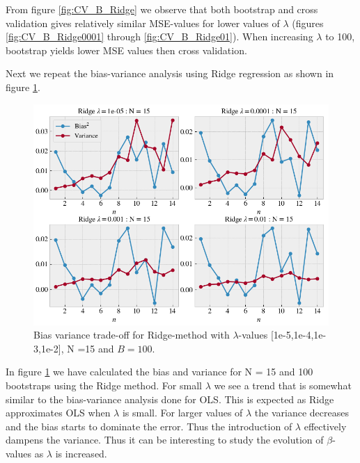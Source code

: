 \documentclass[norsk,a4paper,12pt]{scrartcl}
\begin{document}
From figure \ref{fig:CV_B_Ridge} we observe that both bootstrap and cross validation gives relatively similar MSE-values for lower values of $\lambda$ (figures \ref{fig:CV_B_Ridge0001} through \ref{fig:CV_B_Ridge01}). When increasing $\lambda$ to 100, bootstrap yields lower MSE values then cross validation.\par 
Next we repeat the bias-variance analysis using Ridge regression as shown in figure \ref{fig:b_v_ridge}.

\begin{figure}[H]
     \centering
     \includegraphics[width=\textwidth]{figures/BVT_Ridge.png}
     \caption{Bias variance trade-off for Ridge-method with $\lambda$-values [1e-5,1e-4,1e-3,1e-2], N =15 and $B = 100$.}
     \label{fig:b_v_ridge}
\end{figure}
In figure \ref{fig:b_v_ridge} we have calculated the bias and  variance for N = 15 and 100 bootstraps using the Ridge method. For small $\lambda$ we see a trend that is somewhat similar to the bias-variance analysis done for OLS. This is expected as Ridge approximates OLS when $\lambda$ is small. For larger values of $\lambda$ the variance decreases and the bias starts to dominate the error. Thus the introduction of $\lambda$ effectively dampens the variance. Thus it can be interesting to study the evolution of $\beta$-values as $\lambda$ is increased.
\newline
\end{document}
